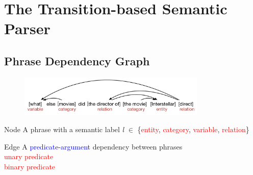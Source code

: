 \documentclass{beamer}
\begin{document}
\section{The Transition-based Semantic Parser}
\subsection{Phrase Dependency Graph}
\begin{frame}
	\begin{figure}
	\centering\includegraphics[width=0.8\textwidth]{introduction/DAG.pdf}
	\end{figure}
	\begin{block}{Node}
		\small A phrase with a semantic label \textit{l} $\in$ \{\textcolor{red}{entity}, \textcolor{red}{category}, \textcolor{red}{variable}, \textcolor{red}{relation}\}
	\end{block}
	\begin{block}{Edge}
		\small A \textcolor{blue}{predicate-argument} dependency between phrases \\
		\textcolor{red}{unary predicate} \\
		\textcolor{red}{binary predicate}
	\end{block}
\end{frame}
\end{document}
